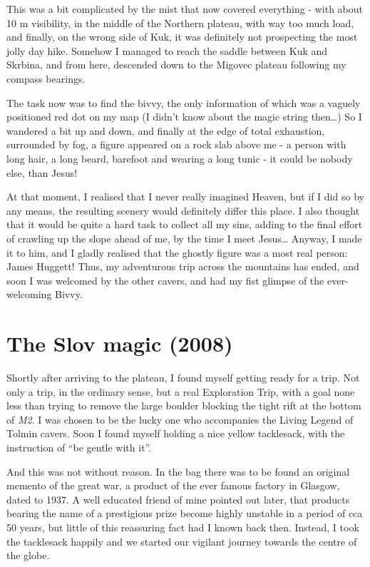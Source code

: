This was a bit complicated by the mist that now covered everything -
with about 10 m visibility, in the middle of the Northern plateau, with
way too much load, and finally, on the wrong side of Kuk, it was
definitely not prospecting the most jolly day hike. Somehow I managed to
reach the saddle between Kuk and Skrbina, and from here, descended down
to the Migovec plateau following my compass bearings.

The task now was to find the bivvy, the only information of which was a
vaguely positioned red dot on my map (I didn't know about the magic
string then\ldots{}) So I wandered a bit up and down, and finally at the
edge of total exhaustion, surrounded by fog, a figure appeared on a rock
slab above me - a person with long hair, a long beard, barefoot and
wearing a long tunic - it could be nobody else, than Jesus!

At that moment, I realised that I never really imagined Heaven, but if I
did so by any means, the resulting scenery would definitely differ this
place. I also thought that it would be quite a hard task to collect all
my sins, adding to the final effort of crawling up the slope ahead of
me, by the time I meet Jesus\ldots{} Anyway, I made it to him, and I
gladly realised that the ghostly figure was a most real person: James
Huggett! Thus, my adventurous trip across the mountains has ended, and
soon I was welcomed by the other cavers, and had my fist glimpse of the
ever-welcoming Bivvy.


\hypertarget{the-slov-magic-2008}{%
\section{The Slov magic (2008)}\label{the-slov-magic-2008}}

Shortly after arriving to the plateau, I found myself getting ready for
a trip. Not only a trip, in the ordinary sense, but a real Exploration
Trip, with a goal none less than trying to remove the large boulder
blocking the tight rift at the bottom of \emph{M2}. I was chosen to be
the lucky one who accompanies the Living Legend of Tolmin cavers. Soon I
found myself holding a nice yellow tacklesack, with the instruction of
``be gentle with it''.

And this was not without reason. In the bag there was to be found an
original memento of the great war, a product of the ever famous factory
in Glasgow, dated to 1937. A well educated friend of mine pointed out
later, that products bearing the name of a prestigious prize become
highly unstable in a period of cca 50 years, but little of this
reassuring fact had I known back then. Instead, I took the tacklesack
happily and we started our vigilant journey towards the centre of the
globe.

